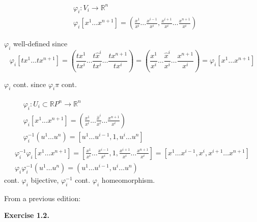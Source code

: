 \documentclass[11pt]{amsart}
\theoremstyle{definition}
\newcommand{\exercisehead}[1]{\medskip\noindent\textbf{Exercise #1.} }
\begin{document}
\[
\begin{aligned}
   & \varphi_i : V_i \to \mathbb{R}^n \\
& \varphi_i [ x^1 \dots x^{n+1} ] = \left( \frac{ x^1 }{ x^i } \dots \frac{ x^{i-1}}{ x^i } , \frac{ x^{i+1}}{ x^i} \dots \frac{x^{n+1}}{ x^i} \right)
\end{aligned}
\]

$\varphi_i$ well-defined since
\[
\varphi_i[tx^1 \dots tx^{n+1}] = \left( \frac{ tx^1 }{ tx^i } \dots \frac{ t\widehat{x}^i }{ tx^i } \dots \frac{ tx^{n+1}}{ tx^i } \right)= \left( \frac{x^1}{ x^i } \dots \frac{ \widehat{x}^i }{ x^i } \dots \frac{ x^{n+1}}{ x^i } \right) = \varphi_i[x^1 \dots x^{n+1} ]
\]

$\varphi_i$ cont. since $\varphi_i \pi$ cont.



\[
\begin{gathered}
  \begin{aligned}
    & \varphi_i : U_i \subset \mathbb{R}P^n \to \mathbb{R}^n \\
    & \varphi_i[x^1 \dots x^{n+1} ] = \left( \frac{x^1}{x^i} \dots \frac{ \widehat{x}^i }{ x^i } \dots \frac{x^{n+1}}{ x^i } \right) \\
    & \varphi^{-1}_i(u^1 \dots u^n) = [ u^1 \dots u^{i-1}, 1 , u^i \dots u^n ]
\end{aligned} \\
  \varphi_i^{-1} \varphi_i[x^1 \dots x^{n+1} ] = \left[ \frac{x^1 }{ x^i } \dots \frac{x^{i-1}}{ x^i } , 1 , \frac{x^{i+1}}{ x^i} \dots \frac{x^{n+1}}{ x^i } \right] = [x^1 \dots x^{i-1}, x^i , x^{i+1} \dots x^{n+1} ] \\
  \varphi_i \varphi^{-1}_i(u^1 \dots u^n) = (u^1 \dots u^{i-1} , u^i  \dots u^n )
\end{gathered}
\]
cont. $\varphi_i$ bijective, $\varphi_i^{-1}$ cont. $\varphi_i$ homeomorphism.

From a previous edition:

\exercisehead{1.2}
\end{document}

